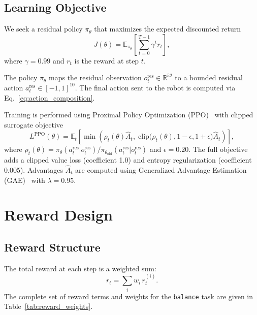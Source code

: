\documentclass[conference]{IEEEtran}
\begin{document}
\subsection{Learning Objective}
\label{sec:learning_objective}

We seek a residual policy $\pi_\theta$ that maximizes the expected
discounted return
\begin{equation}
J(\theta)=\mathbb{E}_{\pi_\theta}\!\left[\sum_{t=0}^{T-1}\gamma^t r_t\right],
\end{equation}
where $\gamma = 0.99$ and $r_t$ is the reward at step $t$.

The policy $\pi_\theta$ maps the residual observation
$o_t^{\mathrm{res}} \in \mathbb{R}^{52}$ to a bounded residual action
$a_t^{\mathrm{res}} \in [-1,1]^{10}$. The final action sent to the
robot is computed via Eq.~\eqref{eq:action_composition}.

Training is performed using Proximal Policy Optimization
(PPO)~\cite{ppo} with clipped surrogate objective
\begin{equation}
L^{\mathrm{PPO}}(\theta) =
\mathbb{E}_t\!\left[
\min\!\left(
\rho_t(\theta)\hat{A}_t,\;
\mathrm{clip}\big(\rho_t(\theta), 1-\epsilon, 1+\epsilon\big)\hat{A}_t
\right)
\right],
\end{equation}
where $\rho_t(\theta)=\pi_\theta(a_t^{\mathrm{res}}|o_t^{\mathrm{res}})/
\pi_{\theta_{\mathrm{old}}}(a_t^{\mathrm{res}}|o_t^{\mathrm{res}})$
and $\epsilon=0.20$.
The full objective adds a clipped value loss (coefficient 1.0) and
entropy regularization (coefficient 0.005).
Advantages $\hat{A}_t$ are computed using Generalized Advantage
Estimation (GAE)~\cite{gae} with $\lambda=0.95$.

\section{Reward Design}
\label{sec:reward}

\subsection{Reward Structure}
The total reward at each step is a weighted sum:
\begin{equation}
r_t = \sum_i w_i\, r_t^{(i)}.
\label{eq:reward_total}
\end{equation}
The complete set of reward terms and weights for the \texttt{balance}
task are given in Table~\ref{tab:reward_weights}.
\end{document}
